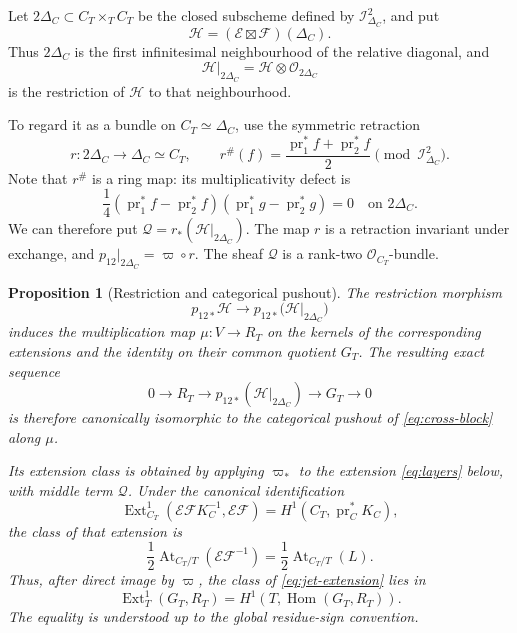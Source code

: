 \documentclass[11pt,a4paper,dvipsnames]{amsart}
\numberwithin{equation}{section}
\theoremstyle{plain}
\newtheorem{proposition}[theorem]{Proposition}
\theoremstyle{definition}
\newcommand{\cO}{\mathcal O}
\newcommand{\cE}{\mathcal E}
\newcommand{\cF}{\mathcal F}
\newcommand{\cH}{\mathcal H}
\newcommand{\At}{\operatorname{At}}
\newcommand{\Hom}{\operatorname{Hom}}
\begin{document}
Let $2\Delta_C\subset C_T\times_T C_T$ be the closed subscheme defined by
$\mathcal I_{\Delta_C}^2$, and put
$$
 \cH=(\cE\boxtimes\cF)(\Delta_C).
$$
Thus $2\Delta_C$ is the first infinitesimal neighbourhood of the relative
diagonal, and
$$
 \cH|_{2\Delta_C}
 =\cH\otimes\cO_{2\Delta_C}
$$
is the restriction of $\cH$ to that neighbourhood.

To regard it as a bundle on $C_T\simeq\Delta_C$, use the symmetric
retraction
$$
 r:2\Delta_C\longrightarrow\Delta_C\simeq C_T,
 \qquad
 r^\#(f)=\frac{\operatorname{pr}_1^*f+\operatorname{pr}_2^*f}{2}
 \pmod{\mathcal I_{\Delta_C}^2}.
$$
Note that $r^\#$ is a ring map: its multiplicativity defect is
$$
 \frac14(\operatorname{pr}_1^*f-\operatorname{pr}_2^*f)
         (\operatorname{pr}_1^*g-\operatorname{pr}_2^*g)=0
 \quad\text{on }2\Delta_C.
$$
We can therefore put $\mathscr Q=r_*(\cH|_{2\Delta_C})$.
The map $r$ is a retraction invariant under exchange, and
$p_{12}|_{2\Delta_C}=\varpi\circ r$.
The sheaf $\mathscr Q$ is a rank-two $\cO_{C_T}$-bundle.

\begin{proposition}[Restriction and categorical pushout]
\label{prop:second-diagonal}
The restriction morphism
$$
 p_{12*}\cH
 \longrightarrow
 p_{12*}\bigl(\cH|_{2\Delta_C}\bigr)
$$
induces the multiplication map $\mu:V\to R_T$ on the kernels of the
corresponding extensions and the identity on their common quotient $G_T$.
The resulting exact sequence
\begin{equation}\label{eq:jet-extension}
0\longrightarrow R_T
\longrightarrow
p_{12*}\!\left(
  \cH|_{2\Delta_C}
\right)
\longrightarrow G_T\longrightarrow0
\end{equation}
is therefore canonically isomorphic to the categorical pushout of
\eqref{eq:cross-block} along $\mu$.

Its extension class is obtained by applying $\varpi_*$ to the
extension \eqref{eq:layers} below, with middle term $\mathscr Q$.
Under the canonical identification
$$
 \operatorname{Ext}^1_{C_T}(\cE\cF K_C^{-1},\cE\cF)
 =H^1(C_T,\operatorname{pr}_C^*K_C),
$$
the class of that extension is
\begin{equation}\label{eq:half-At}
 \frac12\At_{C_T/T}(\cE\cF^{-1})
 =\frac12\At_{C_T/T}(L).
\end{equation}
Thus, after direct image
by $\varpi$, 
the class of \eqref{eq:jet-extension} lies in
\begin{equation}\label{eq:jet-extension-target}
 \operatorname{Ext}^1_T(G_T,R_T)
 =H^1\!\left(T,\Hom(G_T,R_T)\right).
\end{equation}
The equality is understood up to the global residue-sign convention.
\end{proposition} 
\end{document}
